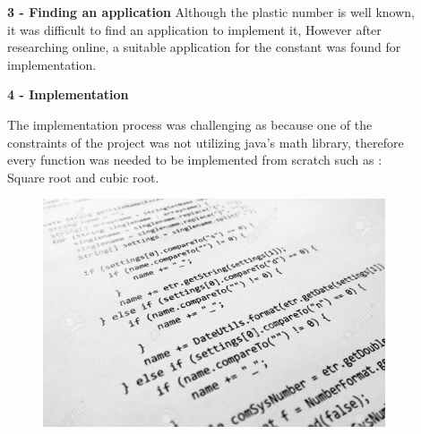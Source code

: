 \documentclass[final]{beamer}
\newlength{\sepwid}
\newlength{\onecolwid}
\newlength{\twocolwid}
\begin{document}
\begin{frame}
\begin{columns}[t]
\begin{column}{\onecolwid}




\end{column} %

\begin{column}{\sepwid}\end{column} %

\begin{column}{\twocolwid} %

\begin{columns}[t,totalwidth=\twocolwid] %

\begin{column}{\onecolwid}\vspace{-.74in} %

\textbf{3 - Finding an application}\newline
\justifying
Although the plastic number is well known, it was difficult to find an application to implement it, However after researching online, a suitable application for the constant was found for implementation. \newline

\textbf{4 - Implementation}\newline
\justifying

The implementation process was challenging as because one of the constraints of the project was not utilizing java's math library, therefore every function was needed to be implemented from scratch such as : Square root and cubic root.\newline
\begin{figure}
\includegraphics[width=1\linewidth]{img/programming3.jpg}\newline
\end{figure}


\end{column}
\end{columns}
\end{column}
\end{columns}
\end{frame}
\end{document}
